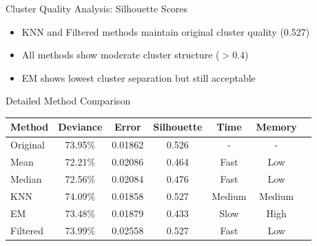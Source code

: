 \documentclass{beamer}
\begin{document}
\begin{frame}{Cluster Quality Analysis: Silhouette Scores}

    \begin{itemize}
        \item KNN and Filtered methods maintain original cluster quality (0.527)
        \item All methods show moderate cluster structure ($> 0.4$)
        \item EM shows lowest cluster separation but still acceptable
    \end{itemize}
\end{frame}

\begin{frame}{Detailed Method Comparison}
    \begin{table}
        \centering
        \begin{tabular}{lcccccc}
            \hline
            \textbf{Method} & \textbf{Deviance} & \textbf{Error} & \textbf{Silhouette} & \textbf{Time} & \textbf{Memory} \\
            \hline
            Original & 73.95\% & 0.01862 & 0.526 & - & - \\
            Mean & 72.21\% & 0.02086 & 0.464 & Fast & Low \\
            Median & 72.56\% & 0.02084 & 0.476 & Fast & Low \\
            KNN & 74.09\% & 0.01858 & 0.527 & Medium & Medium \\
            EM & 73.48\% & 0.01879 & 0.433 & Slow & High \\
            Filtered & 73.99\% & 0.02558 & 0.527 & Fast & Low \\
            \hline
        \end{tabular}
    \end{table}
\end{frame}
\end{document}
